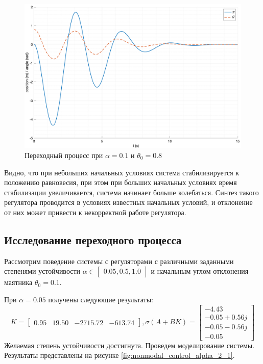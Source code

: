 \begin{figure}[ht!]
    \centering
    \includegraphics[width=\textwidth]{media/plots/nonmodal_controlers_min/out_3.png}
    \caption{Переходный процесс при $\alpha = 0.1$ и $\theta_0 = 0.8$}
    \label{fig:nonmodal_control_alpha_1_3}
\end{figure}
\FloatBarrier
Видно, что при небольших начальных условиях система стабилизируется к положению равновесия,
при этом при больших начальных условиях время стабилизации увеличивается, система начинает
больше колебаться. 
Синтез такого регулятора проводится в условиях известных начальных условий, 
и отклонение от них может привести к некорректной работе регулятора. 

\subsection{Исследование переходного процесса}
Рассмотрим поведение системы с регуляторами с различными заданными степенями устойчивости 
$\alpha \in \begin{bmatrix}0.05, 0.5, 1.0\end{bmatrix}$ и начальным углом отклонения маятника 
$\theta_0 = 0.1$. 

При $\alpha = 0.05$ получены следующие результаты: 
\begin{equation}
    K = \begin{bmatrix} 0.95  & 19.50  & -2715.72  & -613.74 \end{bmatrix}, \sigma(A + BK) = \begin{bmatrix} -4.43 \\ -0.05 + 0.56j \\ -0.05 - 0.56j \\ -0.05  \end{bmatrix}
\end{equation}
Желаемая степень устойчивости достигнута. Проведем моделирование системы. Результаты 
представлены на рисунке \ref{fig:nonmodal_control_alpha_2_1}.

